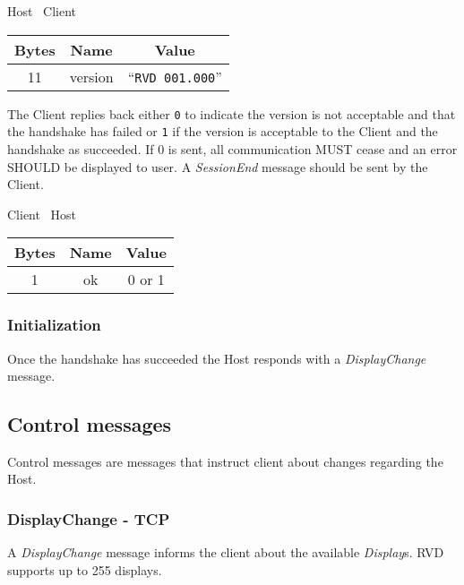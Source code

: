 \begin{center}
    Host \textrightarrow\ Client\\
    \begin{tabular}{|c|c|c|}
        \hline
        \textbf{Bytes} & \textbf{Name} & \textbf{Value}           \\
        \hline
        11             & version       & ``\texttt{RVD 001.000}'' \\
        \hline
    \end{tabular}
\end{center}

The Client replies back either \texttt{0} to indicate the version is not acceptable and that the handshake has
failed or \texttt{1} if the version is acceptable to the Client and the handshake as succeeded. If 0 is sent, all
communication MUST cease and an error SHOULD be displayed to user. A \emph{SessionEnd} message should be sent by
the Client. %

\begin{center}
    Client \textrightarrow\ Host\\
    \begin{tabular}{|c|c|c|}
        \hline
        \textbf{Bytes} & \textbf{Name} & \textbf{Value} \\
        \hline
        1              & ok            & 0 or 1         \\
        \hline
    \end{tabular}
\end{center}

\subsubsection{Initialization}

Once the handshake has succeeded the Host responds with a \emph{DisplayChange} message.

\subsection{Control messages}
Control messages are messages that instruct client about changes regarding the Host.

\subsubsection{DisplayChange - TCP}
A \emph{DisplayChange} message informs the client about the available \emph{Display}s. RVD supports up to 255
displays.

